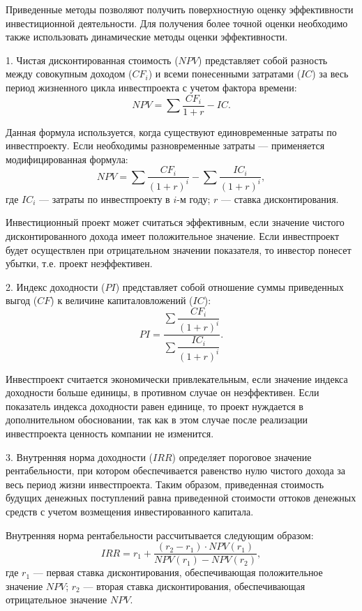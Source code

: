 Приведенные методы позволяют получить поверхностную оценку эффективности инвестиционной деятельности. Для получения более точной оценки необходимо также использовать динамические методы оценки эффективности.

1. Чистая дисконтированная стоимость ($NPV$) представляет собой разность между совокупным доходом ($CF_i$) и всеми понесенными затратами ($IC$) за весь период жизненного цикла инвестпроекта с учетом фактора времени:
\begin{equation}\label{npv}
NPV = \sum \dfrac{CF_i}{1+r} - IC.
\end{equation}

Данная формула используется, когда существуют единовременные затраты по инвестпроекту. Если необходимы разновременные затраты --- применяется модифицированная формула:
\begin{equation}\label{npv_mod}
NPV = \sum \dfrac{CF_i}{(1+r)^i} - \sum \dfrac{IC_i}{(1+r)^i},
\end{equation}
где $IC_i$ --- затраты по инвестпроекту в $i$-м году; $r$ --- ставка дисконтирования.

Инвестиционный проект может считаться эффективным, если значение чистого дисконтированного дохода имеет положительное значение. Если инвестпроект будет осуществлен при отрицательном значении показателя, то инвестор понесет убытки, т.е. проект неэффективен.

2. Индекс доходности ($PI$) представляет собой отношение суммы приведенных выгод ($CF$) к величине капиталовложений ($IC$):
\begin{equation}\label{ind_dohod}
PI = \dfrac{\sum\dfrac{CF_i}{(1+r)^i}}{\sum\dfrac{IC_i}{(1+r)^i}}.
\end{equation}

Инвестпроект считается экономически привлекательным, если значение индекса доходности больше единицы, в противном случае он неэффективен. Если показатель индекса доходности равен единице, то проект нуждается в дополнительном обосновании, так как в этом случае после реализации инвестпроекта ценность компании не изменится.

3. Внутренняя норма доходности ($IRR$) определяет пороговое значение рентабельности, при котором обеспечивается равенство нулю чистого дохода за весь период жизни инвестпроекта. Таким образом, приведенная стоимость будущих денежных поступлений равна приведенной стоимости оттоков денежных средств с учетом возмещения инвестированного капитала.

Внутренняя норма рентабельности рассчитывается следующим образом:
\begin{equation}\label{vnutr_norma_rent}
IRR = r_1 + \dfrac{(r_2 - r_1) \cdot NPV(r_1)}{NPV(r_1) - NPV(r_2)},
\end{equation}
где $r_1$ --- первая ставка дисконтирования, обеспечивающая положительное значение $NPV$; $r_2$ --- вторая ставка дисконтирования, обеспечивающая отрицательное значение $NPV$.

